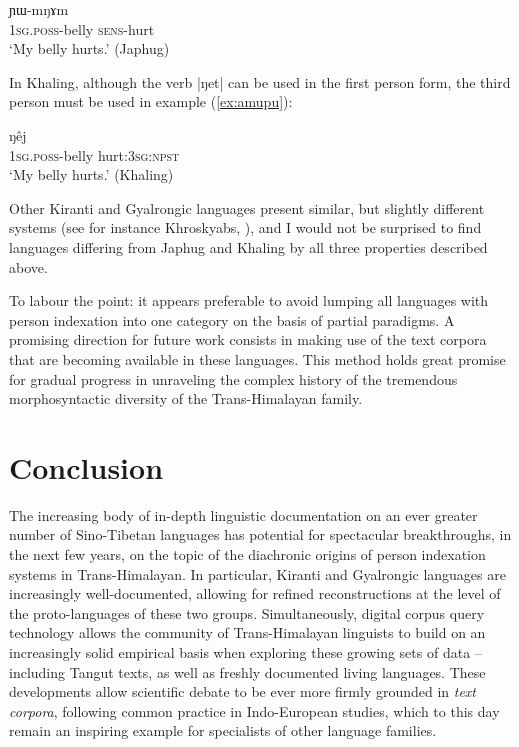 \documentclass[oldfontcommands,oneside,a4paper,11pt]{article}
\newcommand{\ipa}[1]{{\phon \mbox{#1}}} %
\begin{document}
\begin{exe}
\ex \label{ex:YWmNAm}
\gll \ipa{a-xtu} 	\ipa{ɲɯ-mŋɤm} \\
\textsc{1sg.poss}-belly \textsc{sens}-hurt \\
\glt `My belly hurts.' (Japhug)
\end{exe}

In Khaling, although the verb \ipa{|ŋet|} can be used in the first person form, the third person must be used in example (\ref{ex:amupu}):

\begin{exe}
\ex \label{ex:amupu}
\gll \ipa{ʔʌ-mupu} 	\ipa{ŋêj} \\
\textsc{1sg.poss}-belly hurt:\textsc{3sg:npst} \\
\glt `My belly hurts.' (Khaling)
\end{exe}

Other Kiranti and Gyalrongic languages present similar, but slightly different systems (see for instance Khroskyabs, \citealt{lai15person}), and I would not be surprised to find languages differing from Japhug and Khaling by all three properties described above. 

To labour the point: it appears preferable to avoid lumping all languages with person indexation into one category on the basis of partial paradigms. A promising direction for future work consists in making use of the text corpora that are becoming available in these languages. This method holds great promise for gradual progress in unraveling the complex history of the tremendous morphosyntactic diversity of the Trans-Himalayan family.

\section{Conclusion}

The increasing body of in-depth linguistic documentation on an ever greater number of Sino-Tibetan languages has potential for spectacular breakthroughs, in the next few years, on the topic of the diachronic origins of person indexation systems in Trans-Himalayan. In particular, Kiranti and Gyalrongic languages are increasingly well-documented, allowing for refined reconstructions at the level of the proto-languages of these two groups. Simultaneously, digital corpus query technology allows the community of Trans-Himalayan linguists to build on an increasingly solid empirical basis when exploring these growing sets of data -- including Tangut texts, as well as freshly documented living languages. These developments allow scientific debate to be ever more firmly grounded in \textit{text corpora}, following common practice in Indo-European studies, which to this day remain an inspiring example for specialists of other language families.

\charis


\end{document}
